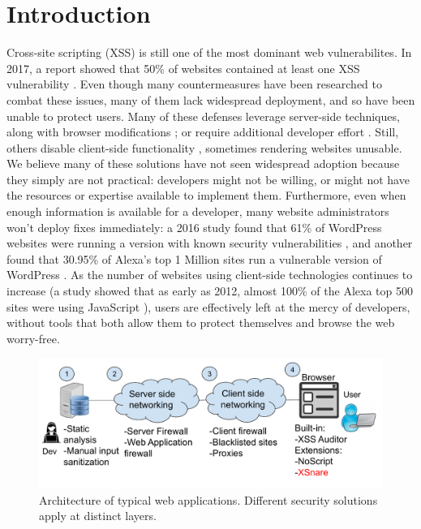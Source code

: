 \section{Introduction} \label{introduction}

Cross-site scripting (XSS) is still one of the most dominant web
vulnerabilites. In 2017, a report showed that 50\% of websites
contained at least one XSS vulnerability \cite{Acunetix}. Even though
many countermeasures have been researched to combat these issues, many
of them lack widespread deployment, and so have been unable to protect
users. Many of these defenses leverage server-side techniques, along
with browser modifications
\cite{Jim:2007:DSI:1242572.1242654,Nadji:2009,Wurzinger:2009:SMX:1656360.1656379,10.1007/978-3-642-31540-4_17};
or require additional developer effort
\cite{10.1007/978-3-319-66399-9_7}. Still, others disable client-side
functionality \cite{Noscript,Snyder:2017:MWD:3133956.3133966},
sometimes rendering websites unusable. We believe many of these
solutions have not seen widespread adoption because they simply are
not practical: developers might not be willing, or might not have the
resources or expertise available to implement them. Furthermore, even
when enough information is available for a developer, many website
administrators won't deploy fixes immediately: a 2016 study found that
61\% of WordPress websites were running a version with known security
vulnerabilities \cite{Sucuri}, and another found that 30.95\% of
Alexa's top 1 Million sites run a vulnerable version of WordPress
\cite{wpwhitesecurity}. As the number of websites using client-side
technologies continues to increase (a study showed that as early as
2012, almost 100\% of the Alexa top 500 sites were using JavaScript
\cite{Stock:2017:WTI:3241189.3241265}), users are effectively left at
the mercy of developers, without tools that both allow them to protect
themselves and browse the web worry-free.


 \begin{figure}[h]
 	\includegraphics[scale=0.37]{img/web_app_architecture_one.pdf}
 	\caption{Architecture of typical web applications. Different security solutions apply at distinct layers.}
 	\label{fig:web_architecture}
 \end{figure}

